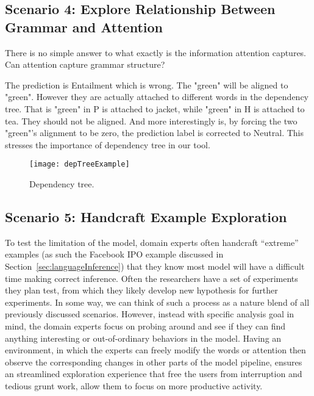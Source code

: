 \subsection{Scenario 4: Explore Relationship Between Grammar and Attention}

There is no simple answer to what exactly is the information attention captures.
Can attention capture grammar structure? 

The prediction is Entailment which is wrong. The "green" will be aligned to "green". However they are actually attached to different words in the dependency tree. That is "green" in P is attached to jacket, while "green" in H is attached to tea. They should not be aligned.
And more interestingly is, by forcing the two "green"'s alignment to be zero, the prediction label is corrected to Neutral. This stresses the importance of dependency tree in our tool.


\begin{figure*}[t]
\centering
\vspace{-2mm}
 \texttt{[image: depTreeExample]}
 \caption{
Dependency tree.
 }
\label{fig:depTreeExample}
\end{figure*}

\subsection{Scenario 5: Handcraft Example Exploration}
To test the limitation of the model, domain experts often handcraft ``extreme'' examples (as such the Facebook IPO example discussed in Section~\ref{sec:languageInference}) that they know most model will have a difficult time making correct inference.
%
Often the researchers have a set of experiments they plan test, from which they likely develop new hypothesis for further experiments.
%
In some way, we can think of such a process as a nature blend of all previously discussed scenarios. However,  instead with specific analysis goal in mind, the domain experts focus on probing around and see if they can find anything interesting or out-of-ordinary behaviors in the model.
%
Having an environment, in which the experts can freely modify the words or attention then observe the corresponding changes in other parts of the model pipeline, ensures an streamlined exploration experience that free the users from interruption and tedious grunt work, allow them to focus on more productive activity.

